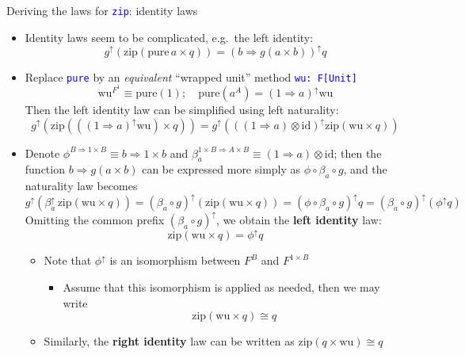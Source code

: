 \documentclass[english]{beamer}
\begin{document}
\begin{frame}{Deriving the laws for \texttt{\textcolor{blue}{\footnotesize{}zip}}:
identity laws}
\begin{itemize}
\item \vspace{-0.2cm}Identity laws seem to be complicated, e.g.\ the left
identity:{\footnotesize{}
\[
g^{\uparrow}\left(\text{zip}\left(\text{pure}\,a\times q\right)\right)=\left(b\Rightarrow g\left(a\times b\right)\right)^{\uparrow}q
\]
}{\footnotesize \par}
\item Replace \texttt{\textcolor{blue}{\footnotesize{}pure}} by an \emph{equivalent}
``wrapped unit'' method \texttt{\textcolor{blue}{\footnotesize{}wu:\ F{[}Unit{]}}}{\footnotesize{}
\[
\text{wu}^{F^{1}}\equiv\text{pure}\left(1\right);\quad\text{pure}(a^{A})=\left(1\Rightarrow a\right)^{\uparrow}\text{wu}
\]
}Then the left identity law can be simplified using left naturality:{\footnotesize{}
\[
g^{\uparrow}\left(\text{zip}\left((\left(1\Rightarrow a\right)^{\uparrow}\text{wu})\times q\right)\right)=g^{\uparrow}\left(\left((1\Rightarrow a)\otimes\text{id}\right)^{\uparrow}\text{zip}\left(\text{wu}\times q\right)\right)
\]
}{\footnotesize \par}
\item Denote {\footnotesize{}$\phi^{B\Rightarrow1\times B}\equiv b\Rightarrow1\times b$}
and {\footnotesize{}$\beta_{a}^{1\times B\Rightarrow A\times B}\equiv\left(1\Rightarrow a\right)\otimes\text{id}$};
then the function {\footnotesize{}$b\Rightarrow g\left(a\times b\right)$}
can be expressed more simply as {\footnotesize{}$\phi\circ\beta_{a}\circ g$},
and the naturality law becomes{\footnotesize{}
\[
g^{\uparrow}(\beta_{a}^{\uparrow}\,\text{zip}\left(\text{wu}\times q\right))=\left(\beta_{a}\circ g\right)^{\uparrow}\left(\text{zip}\left(\text{wu}\times q\right)\right)=\left(\phi\circ\beta_{a}\circ g\right)^{\uparrow}q=\left(\beta_{a}\circ g\right)^{\uparrow}(\phi^{\uparrow}q)
\]
}Omitting the common prefix {\footnotesize{}$\left(\beta_{a}\circ g\right)^{\uparrow}$},
we obtain the \textbf{left identity} law:{\footnotesize{}
\[
\text{zip}\left(\text{wu}\times q\right)=\phi^{\uparrow}q
\]
}{\footnotesize \par}
\begin{itemize}
\item Note that $\phi^{\uparrow}$ is an isomorphism between $F^{B}$ and
$F^{1\times B}$
\begin{itemize}
\item Assume that this isomorphism is applied as needed, then we may write{\footnotesize{}
\[
\text{zip}\left(\text{wu}\times q\right)\cong q
\]
}{\footnotesize \par}
\end{itemize}
\item Similarly, the \textbf{right identity} law can be written as {\footnotesize{}$\text{zip}\left(q\times\text{wu}\right)\cong q$}{\footnotesize \par}
\end{itemize}
\end{itemize}
\end{frame}
\end{document}
